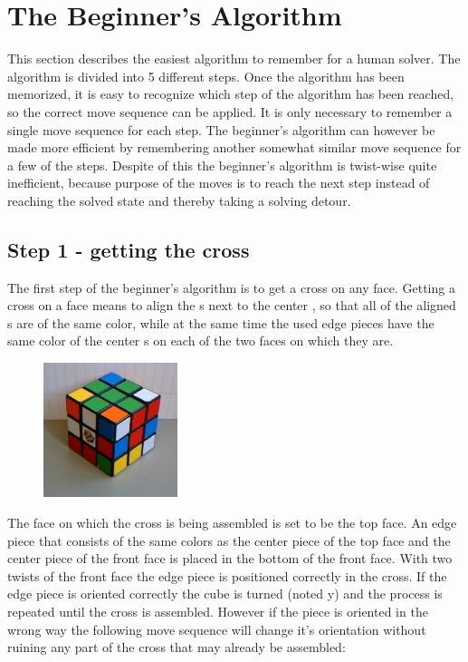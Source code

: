 \section{The Beginner's Algorithm}
\label{sec:beginner}
This section describes the easiest algorithm to remember for a human solver. The algorithm is divided into 5 different steps. Once the algorithm has been memorized, it is easy to recognize which step of the algorithm has been reached, so the correct move sequence can be applied. It is only necessary to remember a single move sequence for each step. The beginner's algorithm can however be made more efficient by remembering another somewhat similar move sequence for a few of the steps. Despite of this the beginner's algorithm is twist-wise quite inefficient, because purpose of the moves is to reach the next step instead of reaching the solved state and thereby taking a solving detour. 

\subsection{Step 1 - getting the cross}
The first step of the beginner's algorithm \cite{beginner} is to get a cross on any face. Getting a cross on a face means to align the \facelet{}s next to the center \facelet{}, so that all of the aligned \facelet{}s are of the same color, while at the same time the used edge pieces have the same color of the center \facelet{}s on each of the two faces on which they are.

\begin{figure}
\begin{center}
	\includegraphics[width=0.35\textwidth]{input/pics/1FLCross.jpg}	
\end{center}
\caption{}
\label{fig:1FL-cross}
\end{figure}

The face on which the cross is being assembled is set to be the top face. An edge piece that consists of the same colors as the center piece of the top face and the center piece of the front face is placed in the bottom of the front face. With two twists of the front face the edge piece is positioned correctly in the cross. If the edge piece is oriented correctly the cube is turned (noted y) and the process is repeated until the cross is assembled. However if the piece is oriented in the wrong way the following move sequence will change it's orientation without ruining any part of the cross that may already be assembled: \\

